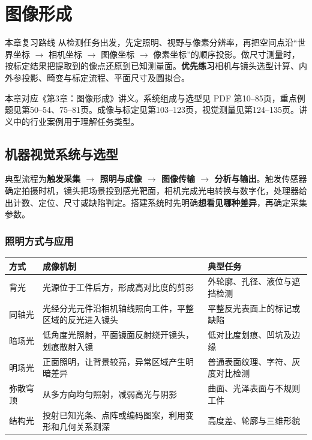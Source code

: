 \chapter{图像形成}
\label{chap:rii-image-formation}

\begin{focusbox}{本章复习路线}
从检测任务出发，先定照明、视野与像素分辨率，再把空间点沿“世界坐标 $\to$ 相机坐标 $\to$ 图像坐标 $\to$ 像素坐标”的顺序投影。做尺寸测量时，按标定结果把提取到的像点还原到已知测量面。\textbf{优先练习}相机与镜头选型计算、内外参投影、畸变与标定流程、平面尺寸及圆拟合。
\end{focusbox}

本章对应《第3章：图像形成》讲义。系统组成与选型见 PDF 第10--85页，重点例题见第50--54、75--81页。成像与标定见第103--123页，视觉测量见第124--135页。讲义中的行业案例用于理解任务类型。

\section{机器视觉系统与选型}

典型流程为\textbf{触发采集 $\to$ 照明与成像 $\to$ 图像传输 $\to$ 分析与输出}。触发传感器确定拍摄时机，镜头把场景投到感光靶面，相机完成光电转换与数字化，处理器给出计数、定位、尺寸或缺陷判定。搭建系统时先明确\textbf{想看见哪种差异}，再确定采集参数。

\subsection{照明方式与应用}

\begin{table}[htbp]
\centering\small
\begin{tabularx}{\linewidth}{@{}p{2.5cm} X X@{}}
\toprule
方式 & 成像机制 & 典型任务 \\
\midrule
背光 & 光源位于工件后方，形成高对比度的剪影 & 外轮廓、孔径、液位与遮挡检测 \\
同轴光 & 光经分光元件沿相机轴线照向工件，平整区域的反光进入镜头 & 平整反光表面上的标记或缺陷 \\
暗场光 & 低角度光照射，平面镜面反射绕开镜头，划痕散射入镜 & 低对比度划痕、凹坑及边缘 \\
明场光 & 正面照明，让背景较亮，异常区域产生明暗差异 & 普通表面纹理、字符、灰度对比检测 \\
弥散穹顶 & 从多方向均匀照射，减弱高光与阴影 & 曲面、光泽表面与不规则工件 \\
结构光 & 投射已知光条、点阵或编码图案，利用变形和几何关系测深 & 高度差、轮廓与三维形貌 \\
\bottomrule
\end{tabularx}
\end{table}

